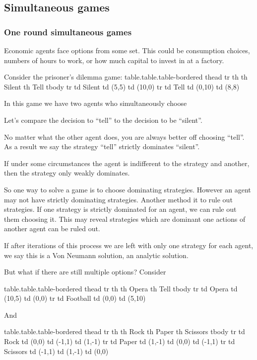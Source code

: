 
\subsection{Simultaneous games}

\subsubsection{One round simultaneous games}

Economic agents face options from some set. This could be consumption choices, numbers of hours to work, or how much capital to invest in at a factory.

Consider the prisoner’s dilemma game:
	table.table.table-bordered
		thead
			tr
				th 
				th Silent
				th Tell
		tbody
			tr
				td Silent
				td (5,5)
				td (10,0)
			tr
				td Tell
				td (0,10)
				td (8,8)

In this game we have two agents who simultaneously choose 

Let’s compare the decision to “tell” to the decision to be “silent”. 

No matter what the other agent does, you are always better off choosing “tell”. As a result we say the strategy “tell” strictly dominates “silent”.

If under some circumstances the agent is indifferent to the strategy and another, then the strategy only weakly dominates.

So one way to solve a game is to choose dominating strategies. However an agent may not have strictly dominating strategies. Another method it to rule out strategies. If one strategy is strictly dominated for an agent, we can rule out them choosing it. This may reveal strategies which are dominant one actions of another agent can be ruled out.

If after iterations of this process we are left with only one strategy for each agent, we say this is a Von Neumann solution, an analytic solution. 

But what if there are still multiple options? Consider

	table.table.table-bordered
		thead
			tr
				th 
				th Opera
				th Tell
		tbody
			tr
				td Opera
				td (10,5)
				td (0,0)
			tr
				td Football
				td (0,0)
				td (5,10)

And

	table.table.table-bordered
		thead
			tr
				th 
				th Rock
				th Paper
				th Scissors
		tbody
			tr
				td Rock
				td (0,0)
				td (-1,1)
				td (1,-1)
			tr
				td Paper
				td (1,-1)
				td (0,0)
				td (-1,1)
			tr
				td Scissors
				td (-1,1)
				td (1,-1)
				td (0,0)

